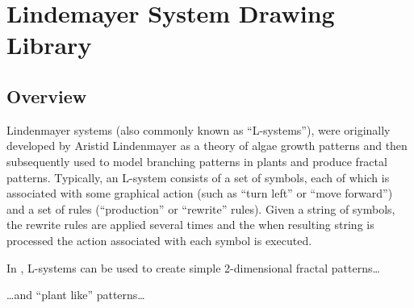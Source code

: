 %
%
%

\section{Lindemayer System Drawing Library}
\subsection{Overview}

Lindenmayer systems (also commonly known as ``L-systems''), were
originally developed by Aristid Lindenmayer as a theory of algae 
growth patterns and then subsequently used to model branching 
patterns in plants and produce fractal patterns.
Typically, an L-system consists of a set of symbols, each of which
is associated with some graphical action (such as ``turn left'' or 
``move forward'') and a set of rules (``production'' or ``rewrite'' 
rules). Given a string of symbols, the rewrite rules are applied 
several times and the when resulting string is processed the action 
associated with each symbol is executed. 

In \pgfname, L-systems can be used to create simple 2-dimensional
fractal patterns\ldots	
\begin{codeexample}[pre={\expandafter\let\csname pgf@lsystem@Koch curve\endcsname=\relax}]
\end{codeexample}

\noindent\ldots and ``plant like'' patterns\ldots

\begin{codeexample}[]
\end{codeexample}

